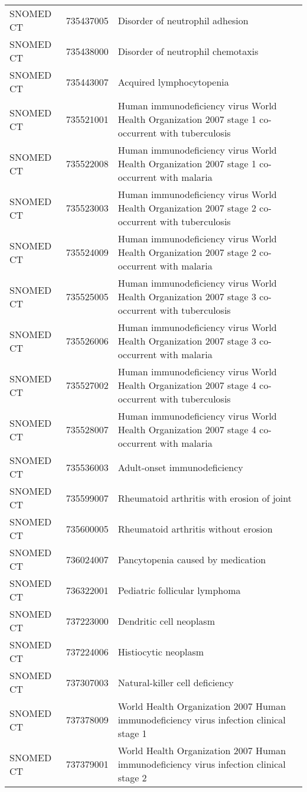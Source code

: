 \begin{longtable}{p{}p{}p{}}
  SNOMED CT & 735437005 & Disorder of neutrophil adhesion \\ 
  SNOMED CT & 735438000 & Disorder of neutrophil chemotaxis \\ 
  SNOMED CT & 735443007 & Acquired lymphocytopenia \\ 
  SNOMED CT & 735521001 & Human immunodeficiency virus World Health Organization 2007 stage 1 co-occurrent with tuberculosis \\ 
  SNOMED CT & 735522008 & Human immunodeficiency virus World Health Organization 2007 stage 1 co-occurrent with malaria \\ 
  SNOMED CT & 735523003 & Human immunodeficiency virus World Health Organization 2007 stage 2 co-occurrent with tuberculosis \\ 
  SNOMED CT & 735524009 & Human immunodeficiency virus World Health Organization 2007 stage 2 co-occurrent with malaria \\ 
  SNOMED CT & 735525005 & Human immunodeficiency virus World Health Organization 2007 stage 3 co-occurrent with tuberculosis \\ 
  SNOMED CT & 735526006 & Human immunodeficiency virus World Health Organization 2007 stage 3 co-occurrent with malaria \\ 
  SNOMED CT & 735527002 & Human immunodeficiency virus World Health Organization 2007 stage 4 co-occurrent with tuberculosis \\ 
  SNOMED CT & 735528007 & Human immunodeficiency virus World Health Organization 2007 stage 4 co-occurrent with malaria \\ 
  SNOMED CT & 735536003 & Adult-onset immunodeficiency \\ 
  SNOMED CT & 735599007 & Rheumatoid arthritis with erosion of joint \\ 
  SNOMED CT & 735600005 & Rheumatoid arthritis without erosion \\ 
  SNOMED CT & 736024007 & Pancytopenia caused by medication \\ 
  SNOMED CT & 736322001 & Pediatric follicular lymphoma \\ 
  SNOMED CT & 737223000 & Dendritic cell neoplasm \\ 
  SNOMED CT & 737224006 & Histiocytic neoplasm \\ 
  SNOMED CT & 737307003 & Natural-killer cell deficiency \\ 
  SNOMED CT & 737378009 & World Health Organization 2007 Human immunodeficiency virus infection clinical stage 1 \\ 
  SNOMED CT & 737379001 & World Health Organization 2007 Human immunodeficiency virus infection clinical stage 2 \\ 

\end{longtable}
